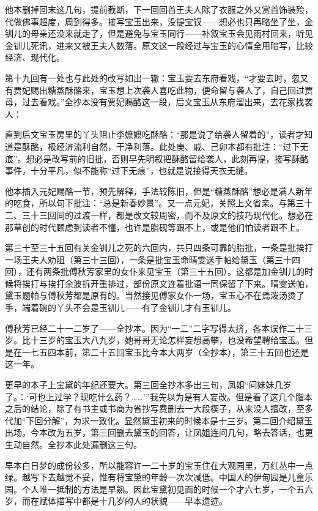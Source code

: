 \par 他本删掉回末这几句，提前截断，下一回回首王夫人除了衣服之外又赏首饰装殓，代做佛事超度，周到得多。接写宝玉出来，没提宝钗——想必也只再略坐了坐，金钏儿的母亲还没来就走了，但是避免与宝玉同行——补叙宝玉会见雨村回来，听见金钏儿死讯，进来又被王夫人数落。原文这一段经过与宝玉的心情全用暗写，比较经济、现代化。
\par 第十九回有一处也与此处的改写如出一辙：宝玉要去东府看戏，“才要去时，忽又有贾妃赐出糖蒸酥酪来，宝玉想上次袭人喜吃此物，便命留与袭人了，自己回过贾母，过去看戏。”全抄本没有贾妃赐酪这一段，后文宝玉从东府溜出来，去花家找袭人：
\par 直到后文宝玉房里的丫头阻止李嬷嬷吃酥酪：“那是说了给袭人留着的”，读者才知道是酥酪，极经济流利自然，干净利落。此处庚、戚、己卯本都有批注：“过下无痕”。想必是改写前的旧批，否则早先明叙把酥酪留给袭人，此刻再提，接写酥酪事件，十分平凡，似不能称“过下无痕”，也就是说接得天衣无缝。
\par 他本插入元妃赐酪一节，预先解释，手法较陈旧，但是“糖蒸酥酪”想必是满人新年的吃食，所以句下批注：“总是新春妙景”。又一点元妃，关照上文省亲。与第三十二、三十三回间的过渡一样，都是改文较周密，而不及原文的技巧现代化。想必在那草创的时代顾虑到读者不懂，也许是脂砚等跟不上，或是他们怕读者跟不上。
\par 第三十至三十五回有关金钏儿之死的六回内，共只四条可靠的脂批，一条是批挨打一场王夫人劝阻（第三十三回），一条是批宝玉命晴雯送手帕给黛玉（第三十四回），还有两条批傅秋芳家里的女仆来见宝玉（第三十五回）。这都是加金钏儿的时候将挨打与挨打余波拆开重排过，部份原文连着批语一同保留了下来。晴雯送帕，黛玉题帕与傅秋芳都是原有的。当然接见傅家女仆一场，宝玉心不在焉泼汤烫了手，端着碗的丫头不会是玉钏儿——有了金钏儿才有玉钏儿。
\par 傅秋芳已经二十一二岁了——全抄本。因为“一二”二字写得太挤，各本误作二十三岁。比十三岁的宝玉大八九岁，她哥哥无论怎样妄想高攀，也没希望聘给宝玉。但是在一七五四本前，第二十五回宝玉比今本大两岁（全抄本），第三十五回也还是这一年。
\par 更早的本子上宝黛的年纪还要大。第三回全抄本多出三句，凤姐“问妹妹几岁了。：‘可也上过学？现吃什么药？……'”我先以为是有人妄改。但是看了这几个脂本之后的结论，除了有书主或书商为省抄写费删去一大段楔子，从来没人擅改，至多代加“下回分解”，为求一致化。显然黛玉初来的时候本是十三岁。第二回介绍黛玉出场，今本改为五岁，第三回删去黛玉的回答，让凤姐连问几句，略去答话，也更生动自然。全抄本此处漏删这三句。
\par 早本白日梦的成份较多，所以能容许一二十岁的宝玉住在大观园里，万红丛中一点绿。越写下去越觉不妥，惟有将宝黛的年龄一次次减低。中国人的伊甸园是儿童乐园。个人唯一抵制的方法是早熟。因此宝黛初见面的时候一个才六七岁，一个五六岁，而在赋体描写中都是十几岁的人的状貌——早本遗迹。
